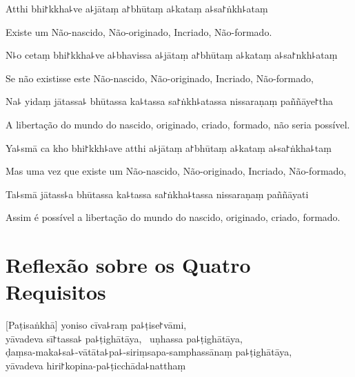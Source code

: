 
\begin{leader}
\end{leader}

Atthi bhi꜓kkha꜕ve a꜕jātaṃ a꜓bhūtaṃ a꜕kataṃ a꜕sa꜓ṅkh꜕ataṃ

\begin{english}
  Existe um Não-nascido, Não-originado, Incriado, Não-formado.
\end{english}

N꜕o cetaṃ bhi꜓kkha꜕ve a꜕bhavissa a꜕jātaṃ a꜓bhūtaṃ a꜕kataṃ a꜕sa꜓nkh꜕ataṃ

\begin{english}
 Se não existisse este Não-nascido, Não-originado, Incriado, Não-formado,
\end{english}

Na꜕ yidaṃ jātassa꜕ bhūtassa ka꜕tassa sa꜓ṅkh꜕atassa nissaraṇaṃ paññāye꜓tha

\begin{english}
  A libertação do mundo do nascido, originado, criado, formado, não seria possível.
\end{english}

Ya꜕smā ca kho bhi꜓kkh꜕ave atthi a꜕jātaṃ a꜓bhūtaṃ a꜕kataṃ a꜕sa꜓ṅkha꜕taṃ

\begin{english}
  Mas uma vez que existe um Não-nascido, Não-originado, Incriado, Não-formado,
\end{english}

Ta꜕smā jātass꜕a bhūtassa ka꜕tassa sa꜓ṅkha꜕tassa nissaraṇaṃ paññāyati

\begin{english}
  Assim é possível a libertação do mundo do nascido, originado, criado, formado.
\end{english}

\clearpage

\chapter[Quatro Requisitos]{Reflexão sobre os Quatro Requisitos}


\begin{leader}
\end{leader}

[Paṭisaṅkhā] yoniso cīva꜕raṃ pa꜕ṭise꜓vāmi, \pause\\
yāvadeva sī꜓tassa꜕ pa꜕ṭighātāya, \pause\ uṇhassa pa꜕ṭighātāya, \pause\\
ḍaṃsa-maka꜕sa꜕-vātāta꜕pa꜕-siriṃsapa-samphassānaṃ pa꜕ṭighātāya, \pause\\
yāvadeva hiri꜓kopina-pa꜕ṭicchāda꜕natthaṃ

